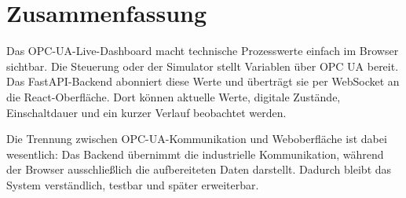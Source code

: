 \documentclass[11pt,a4paper,parskip=half]{scrartcl}
\begin{document}
\section{Zusammenfassung}

Das OPC-UA-Live-Dashboard macht technische Prozesswerte einfach im Browser sichtbar. Die Steuerung oder der Simulator stellt Variablen über OPC UA bereit. Das FastAPI-Backend abonniert diese Werte und überträgt sie per WebSocket an die React-Oberfläche. Dort können aktuelle Werte, digitale Zustände, Einschaltdauer und ein kurzer Verlauf beobachtet werden.

Die Trennung zwischen OPC-UA-Kommunikation und Weboberfläche ist dabei wesentlich: Das Backend übernimmt die industrielle Kommunikation, während der Browser ausschließlich die aufbereiteten Daten darstellt. Dadurch bleibt das System verständlich, testbar und später erweiterbar.
\end{document}
